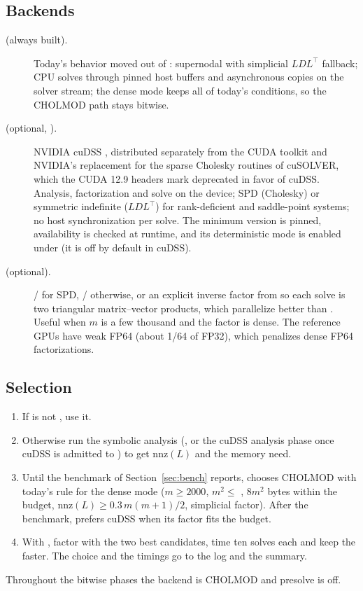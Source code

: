 \documentclass[11pt]{article}
\begin{document}
\subsection{Backends}
\begin{description}
  \item[ (always built).] Today's behavior moved out of : supernodal with
  simplicial $LDL^\top$ fallback; CPU solves through pinned host buffers and asynchronous copies on the solver
  stream; the dense mode keeps all of today's conditions, so the CHOLMOD path stays bitwise.
  \item[ (optional, ).] NVIDIA cuDSS \cite{cudss}, distributed
  separately from the CUDA toolkit and NVIDIA's replacement for the sparse Cholesky routines of cuSOLVER,
  which the CUDA 12.9 headers mark deprecated in favor of cuDSS. Analysis, factorization and solve on the
  device; SPD (Cholesky) or symmetric indefinite ($LDL^\top$) for rank-deficient and saddle-point systems; no
  host synchronization per solve. The minimum version is pinned, availability is checked at runtime, and its
  deterministic mode is enabled under  (it is off by default in cuDSS).
  \item[ (optional).] / for SPD, /
  otherwise, or an explicit inverse factor from  so each solve is two triangular matrix--vector
  products, which parallelize better than . Useful when $m$ is a few thousand and the factor is
  dense. The reference GPUs have weak FP64 (about 1/64 of FP32), which penalizes dense FP64 factorizations.
\end{description}

\subsection{Selection}\label{sec:linsys-selection}
\begin{enumerate}
  \item If  is not , use it.
  \item Otherwise run the symbolic analysis (, or the cuDSS analysis phase once cuDSS is
  admitted to ) to get $\mathrm{nnz}(L)$ and the memory need.
  \item Until the benchmark of Section~\ref{sec:bench} reports,  chooses CHOLMOD with today's rule
  for the dense mode ($m\ge2000$, $m^2\le$ , $8m^2$ bytes within the budget,
  $\mathrm{nnz}(L)\ge0.3\,m(m+1)/2$, simplicial factor). After the benchmark,  prefers cuDSS when its
  factor fits the budget.
  \item With , factor with the two best candidates, time ten solves each and keep
  the faster. The choice and the timings go to the log and the summary.
\end{enumerate}
Throughout the bitwise phases the backend is CHOLMOD and presolve is off.
\end{document}
